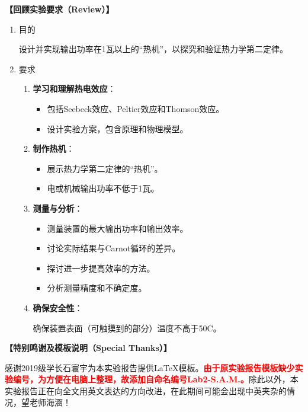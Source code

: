 \documentclass[dvipsnames, svgnames,a4paper,11pt]{article}
\begin{document}
	\textbf{【回顾实验要求（Review）】}
	\begin{enumerate}
		\item 目的
		
		设计并实现输出功率在1瓦以上的“热机”，以探究和验证热力学第二定律。
		
		\item 要求
		\begin{enumerate}
			\item \textbf{学习和理解热电效应}：
			\begin{itemize}
				\item 包括Seebeck效应、Peltier效应和Thomson效应。
				\item 设计实验方案，包含原理和物理模型。
			\end{itemize}
			
			\item \textbf{制作热机}：
			\begin{itemize}
				\item 展示热力学第二定律的“热机”。
				\item 电或机械输出功率不低于1瓦。
			\end{itemize}
			
			\item \textbf{测量与分析}：
			\begin{itemize}
				\item 测量装置的最大输出功率和输出效率。
				\item 讨论实际结果与Carnot循环的差异。
				\item 探讨进一步提高效率的方法。
				\item 分析测量精度和不确定度。
			\end{itemize}
			
			\item \textbf{确保安全性}：
			
			确保装置表面（可触摸到的部分）温度不高于50\degree C。
			
		\end{enumerate}
	\end{enumerate}
	
	
	
	
	
	
	
	\textbf{【特别鸣谢及模板说明（Special Thanks）】}	
	
	感谢2019级学长石寰宇为本实验报告提供\LaTeX 模板。\textcolor{red}{\textbf{由于原实验报告模板缺少实验编号，为方便在电脑上整理，故添加自命名编号Lab2-S.A.M.。}}除此以外，本实验报告正在向全文用英文表达的方向改进，在此期间可能会出现中英夹杂的情况，望老师海涵！
	
\end{document}
